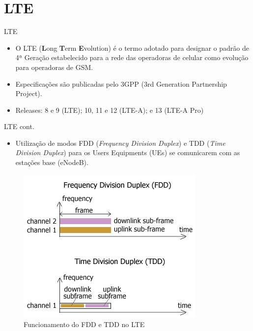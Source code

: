\documentclass[10pt,aspectratio=169]{beamer} %
\begin{document}
\section{LTE}
\begin{frame}{LTE}
\flushleft
    \begin{itemize}
        \item O LTE (\textbf{L}ong \textbf{T}erm \textbf{E}volution) é o termo adotado para designar o padrão de 4ª Geração estabelecido para a rede das operadoras de celular como evolução para operadoras de GSM.
        \item Especificações são publicadas pelo 3GPP (3rd Generation Partnership Project).
        \item Releases: 8 e 9 (LTE); 10, 11 e 12 (LTE-A); e 13 (LTE-A Pro)
    \end{itemize}
\end{frame}
\begin{frame}{LTE cont.}
    \begin{itemize}
        \item Utilização de modos FDD (\textit{Frequency Division Duplex}) e TDD (\textit{Time Division Duplex}) para os Users Equipments (UEs) se comunicarem com as estações base (eNodeB).
    \end{itemize}
\begin{figure}[!htb]
    \centering
    \includegraphics[scale=0.45]{LRCgraphics/fdd_tdd-2.jpg}
    \caption{Funcionamento do FDD e TDD no LTE \cite{carvalho2013}}
\end{figure}
\end{frame}
\end{document}
